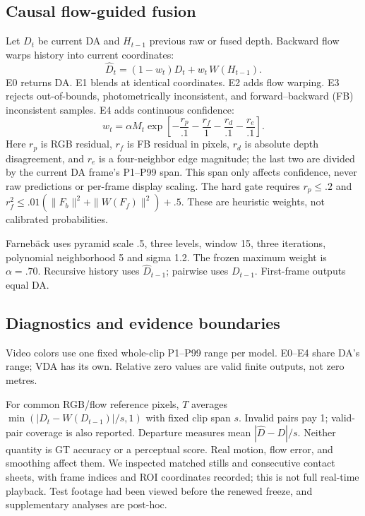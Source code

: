 \documentclass[10pt,twocolumn,letterpaper]{article}
\begin{document}
\subsection{Causal flow-guided fusion}
Let $D_t$ be current DA and $H_{t-1}$ previous raw or fused depth. Backward flow warps history into current coordinates:
\begin{equation}
\widehat D_t=(1-w_t)D_t+w_t\,W(H_{t-1}).
\end{equation}
E0 returns DA. E1 blends at identical coordinates. E2 adds flow warping. E3 rejects out-of-bounds, photometrically inconsistent, and forward--backward (FB) inconsistent samples. E4 adds continuous confidence:
\begin{equation}
w_t=\alpha M_t\exp\!\left[-\frac{r_p}{.1}-\frac{r_f}{1}
-\frac{r_d}{.1}-\frac{r_e}{.1}\right].
\label{eq:confidence}
\end{equation}
Here $r_p$ is RGB residual, $r_f$ is FB residual in pixels, $r_d$ is absolute depth disagreement, and $r_e$ is a four-neighbor edge magnitude; the last two are divided by the current DA frame's P1--P99 span. This span only affects confidence, never raw predictions or per-frame display scaling. The hard gate requires $r_p\le.2$ and $r_f^2\le.01(\|F_b\|^2+\|W(F_f)\|^2)+.5$. These are heuristic weights, not calibrated probabilities.

Farneb\"ack uses pyramid scale .5, three levels, window 15, three iterations, polynomial neighborhood 5 and sigma 1.2. The frozen maximum weight is $\alpha=.70$. Recursive history uses $\widehat D_{t-1}$; pairwise uses $D_{t-1}$. First-frame outputs equal DA.

\subsection{Diagnostics and evidence boundaries}
Video colors use one fixed whole-clip P1--P99 range per model. E0--E4 share DA's range; VDA has its own. Relative zero values are valid finite outputs, not zero metres.

For common RGB/flow reference pixels, $T$ averages $\min(|D_t-W(D_{t-1})|/s,1)$ with fixed clip span $s$. Invalid pairs pay 1; valid-pair coverage is also reported. Departure measures mean $|\widehat D-D|/s$. Neither quantity is GT accuracy or a perceptual score. Real motion, flow error, and smoothing affect them. We inspected matched stills and consecutive contact sheets, with frame indices and ROI coordinates recorded; this is not full real-time playback. Test footage had been viewed before the renewed freeze, and supplementary analyses are post-hoc.
\end{document}
